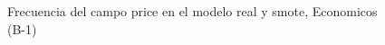 \begin{figure}[H]
    \centering
    
    \caption{Frecuencia del campo  price en el modelo real y smote, Economicos (B-1)}
    \label{frecuency- Price-smote-enc}
\end{figure}